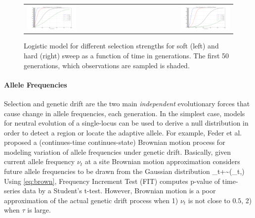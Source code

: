 \documentclass[11pt]{article}
\begin{document}
\begin{figure}[t]
	\begin{tabular}{lr}
		\centering
		\includegraphics[trim={2in 0.1in 1.5in 
			0in},clip,page=2,width=0.5\textwidth]{sigmoidSoft}
		&\includegraphics[trim={2in 0.1in 1.9in 
			0in},clip,page=2,width=0.5\textwidth]{sigmoidHard}
	\end{tabular}
	\caption{Logistic model for different selection strengths for soft (left) 
		and hard (right) sweep as a function of time in generations. The first 
		50 
		generations, which observations are sampled is shaded.} 	 
	\label{fig:sweep}
\end{figure}

\paragraph{Allele Frequencies}
Selection and genetic drift are the two main \emph{independent} evolutionary 
forces that cause change in allele frequencies, each generation. 
In the simplest case, models for neutral evolution of a single-locus can be 
used to derive a null distribution in order to detect a region or locate the 
adaptive allele.
For example, Feder et al. 
\cite{feder2014Identifying} proposed a (continues-time continues-state) 
Brownian motion process for modeling variation of allele frequencies under 
genetic drift. Basically, given current allele frequency $\nu_t$ at a site 
Brownian motion approximation considers future allele frequencies to be drawn 
from the Gaussian distribution
\beq
\nu_{t+\tau}\sim \Nc\left(\nu_t,\tau\right) 
\label{eq:brown}
\eeq
Using \eqref{eq:brown}, Frequency Increment Test (FIT) 
\cite{feder2014Identifying} computes p-value of 
time-series data by a Student's t-test. However, Brownian motion is a poor 
approximation of the actual genetic drift process when 1) $\nu_t$ is not close 
to $0.5$, 2) when $\tau$ is large.
\end{document}
